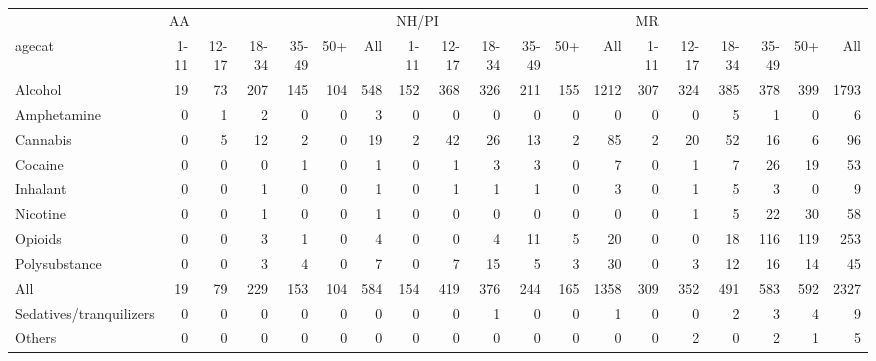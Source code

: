 \centering\begin{tabular}{lrrrrrrrrrrrrrrrrrr}
\toprule
{} & \multicolumn{6}{l}{AA} & \multicolumn{6}{l}{NH/PI} & \multicolumn{6}{l}{MR} \\
agecat & 1-11 & 12-17 & 18-34 & 35-49 & 50+ & All &  1-11 & 12-17 & 18-34 & 35-49 & 50+ &  All & 1-11 & 12-17 & 18-34 & 35-49 &  50+ &   All \\
\midrule
Alcohol                 &   19 &    73 &   207 &   145 & 104 & 548 &   152 &   368 &   326 &   211 & 155 & 1212 &  307 &   324 &   385 &   378 &  399 &  1793 \\
Amphetamine             &    0 &     1 &     2 &     0 &   0 &   3 &     0 &     0 &     0 &     0 &   0 &    0 &    0 &     0 &     5 &     1 &    0 &     6 \\
Cannabis                &    0 &     5 &    12 &     2 &   0 &  19 &     2 &    42 &    26 &    13 &   2 &   85 &    2 &    20 &    52 &    16 &    6 &    96 \\
Cocaine                 &    0 &     0 &     0 &     1 &   0 &   1 &     0 &     1 &     3 &     3 &   0 &    7 &    0 &     1 &     7 &    26 &   19 &    53 \\
Inhalant                &    0 &     0 &     1 &     0 &   0 &   1 &     0 &     1 &     1 &     1 &   0 &    3 &    0 &     1 &     5 &     3 &    0 &     9 \\
Nicotine                &    0 &     0 &     1 &     0 &   0 &   1 &     0 &     0 &     0 &     0 &   0 &    0 &    0 &     1 &     5 &    22 &   30 &    58 \\
Opioids                 &    0 &     0 &     3 &     1 &   0 &   4 &     0 &     0 &     4 &    11 &   5 &   20 &    0 &     0 &    18 &   116 &  119 &   253 \\
Polysubstance           &    0 &     0 &     3 &     4 &   0 &   7 &     0 &     7 &    15 &     5 &   3 &   30 &    0 &     3 &    12 &    16 &   14 &    45 \\
All                     &   19 &    79 &   229 &   153 & 104 & 584 &   154 &   419 &   376 &   244 & 165 & 1358 &  309 &   352 &   491 &   583 &  592 &  2327 \\
Sedatives/tranquilizers &    0 &     0 &     0 &     0 &   0 &   0 &     0 &     0 &     1 &     0 &   0 &    1 &    0 &     0 &     2 &     3 &    4 &     9 \\
Others                  &    0 &     0 &     0 &     0 &   0 &   0 &     0 &     0 &     0 &     0 &   0 &    0 &    0 &     2 &     0 &     2 &    1 &     5 \\
\bottomrule
\end{tabular}
